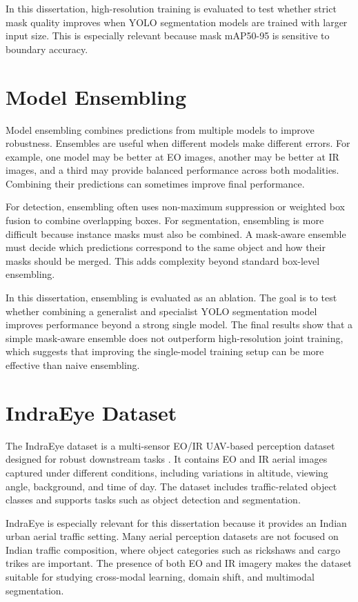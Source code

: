 In this dissertation, high-resolution training is evaluated to test whether strict mask quality improves when YOLO segmentation models are trained with larger input size. This is especially relevant because mask mAP50-95 is sensitive to boundary accuracy.

\section{Model Ensembling}

Model ensembling combines predictions from multiple models to improve robustness. Ensembles are useful when different models make different errors. For example, one model may be better at EO images, another may be better at IR images, and a third may provide balanced performance across both modalities. Combining their predictions can sometimes improve final performance.

For detection, ensembling often uses non-maximum suppression or weighted box fusion to combine overlapping boxes. For segmentation, ensembling is more difficult because instance masks must also be combined. A mask-aware ensemble must decide which predictions correspond to the same object and how their masks should be merged. This adds complexity beyond standard box-level ensembling.

In this dissertation, ensembling is evaluated as an ablation. The goal is to test whether combining a generalist and specialist YOLO segmentation model improves performance beyond a strong single model. The final results show that a simple mask-aware ensemble does not outperform high-resolution joint training, which suggests that improving the single-model training setup can be more effective than naive ensembling.

\section{IndraEye Dataset}

The IndraEye dataset is a multi-sensor EO/IR UAV-based perception dataset designed for robust downstream tasks \cite{indraeye2024}. It contains EO and IR aerial images captured under different conditions, including variations in altitude, viewing angle, background, and time of day. The dataset includes traffic-related object classes and supports tasks such as object detection and segmentation.

IndraEye is especially relevant for this dissertation because it provides an Indian urban aerial traffic setting. Many aerial perception datasets are not focused on Indian traffic composition, where object categories such as rickshaws and cargo trikes are important. The presence of both EO and IR imagery makes the dataset suitable for studying cross-modal learning, domain shift, and multimodal segmentation.

